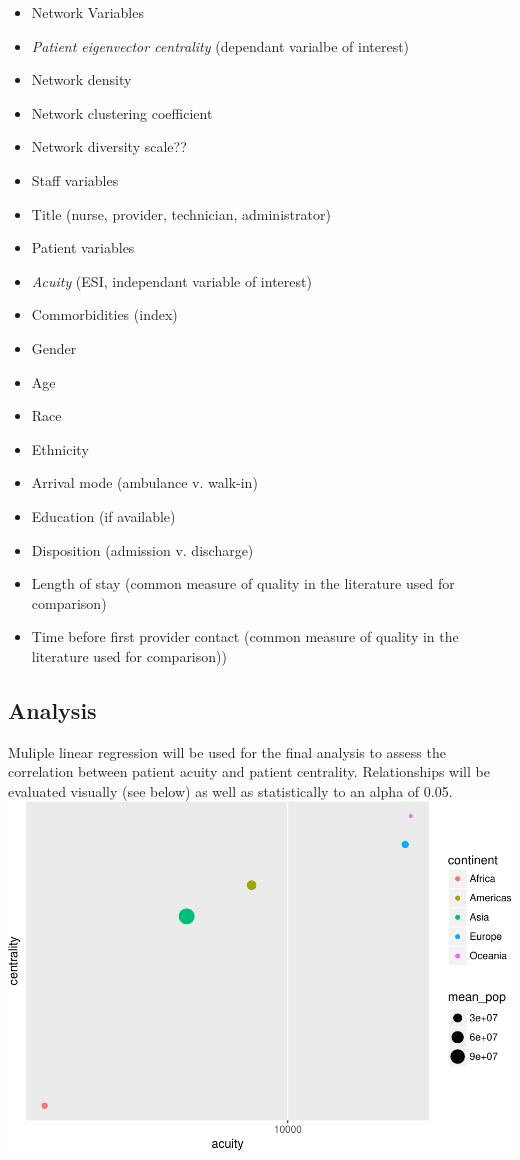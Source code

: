 \documentclass[]{elsarticle} %
\makeatletter
\providecommand{\tightlist}{%
  \setlength{\itemsep}{0pt}\setlength{\parskip}{0pt}}
\def\maxwidth{\ifdim\Gin@nat@width>\linewidth\linewidth
\else\Gin@nat@width\fi}
\let\Oldincludegraphics\includegraphics
\renewcommand{\includegraphics}[1]{\Oldincludegraphics[width=\maxwidth]{#1}}
\makeatother
\begin{document}
\begin{itemize}
\tightlist
\item
  Network Variables
\item
  \emph{Patient eigenvector centrality} (dependant varialbe of interest)
\item
  Network density
\item
  Network clustering coefficient
\item
  Network diversity scale??
\item
  Staff variables
\item
  Title (nurse, provider, technician, administrator)
\item
  Patient variables
\item
  \emph{Acuity} (ESI, independant variable of interest)
\item
  Commorbidities (index)
\item
  Gender
\item
  Age
\item
  Race
\item
  Ethnicity
\item
  Arrival mode (ambulance v. walk-in)
\item
  Education (if available)
\item
  Disposition (admission v. discharge)
\item
  Length of stay (common measure of quality in the literature used for
  comparison)
\item
  Time before first provider contact (common measure of quality in the
  literature used for comparison))
\end{itemize}

\subsection{Analysis}\label{analysis}

Muliple linear regression will be used for the final analysis to assess
the correlation between patient acuity and patient centrality.
Relationships will be evaluated visually (see below) as well as
statistically to an alpha of 0.05.
\includegraphics{Flynn_Project_files/figure-latex/unnamed-chunk-2-1.pdf}
\end{document}

